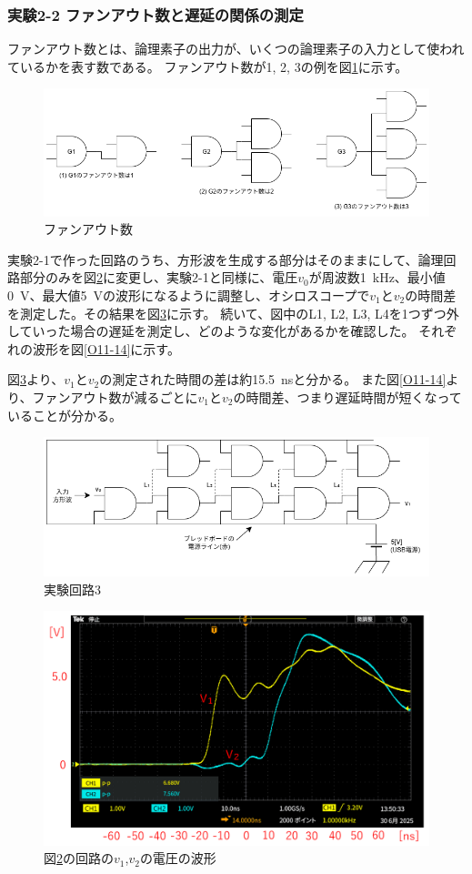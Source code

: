 \documentclass[uplatex, a4j, dvipdfmx]{jsarticle}
\begin{document}
\subsubsection*{実験2-2 ファンアウト数と遅延の関係の測定}
ファンアウト数とは、論理素子の出力が、いくつの論理素子の入力として使われているかを表す数である。
ファンアウト数が1, 2, 3の例を図\ref{E6}に示す。
\begin{figure}[htbp]
    \centering
    \includegraphics[width=0.7\linewidth]{picture/E6.png}
    \caption{ファンアウト数}
    \label{E6}
\end{figure}

実験2-1で作った回路のうち、方形波を生成する部分はそのままにして、論理回路部分のみを図\ref{E7}に変更し、実験2-1と同様に、電圧$v_0$が周波数\SI{1}{\kilo\hertz}、最小値\SI{0}{\volt}、最大値\SI{5}{\volt}の波形になるように調整し、オシロスコープで$v_1$と$v_2$の時間差を測定した。その結果を図\ref{O10}に示す。
続いて、図中のL1, L2, L3, L4を1つずつ外していった場合の遅延を測定し、どのような変化があるかを確認した。
それぞれの波形を図\ref{O11-14}に示す。


図\ref{O10}より、$v_1$と$v_2$の測定された時間の差は約\SI{15.5}{\nano\second}と分かる。
また図\ref{O11-14}より、ファンアウト数が減るごとに$v_1$と$v_2$の時間差、つまり遅延時間が短くなっていることが分かる。
\begin{figure}[htbp]
    \centering
    \includegraphics[width=0.7\linewidth]{picture/E7.png}
    \caption{実験回路3}
    \label{E7}
\end{figure}
\begin{figure}[htbp]
    \centering
    \includegraphics[width=0.8\linewidth]{picture/O10.png}
    \caption{図\ref{E7}の回路の$v_1$,$v_2$の電圧の波形}
    \label{O10}
\end{figure}
\end{document}
